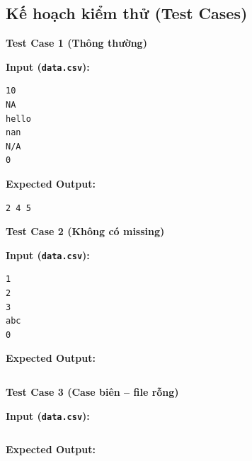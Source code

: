 \subsection{Kế hoạch kiểm thử (Test Cases)}

\textbf{Test Case 1 (Thông thường)}

\textbf{Input (\texttt{data.csv}):}
\begin{lstlisting}
10
NA
hello
nan
N/A
0

\end{lstlisting}

\textbf{Expected Output:}
\begin{lstlisting}
2 4 5
\end{lstlisting}

\vspace{0.5cm}

\textbf{Test Case 2 (Không có missing)}

\textbf{Input (\texttt{data.csv}):}
\begin{lstlisting}
1
2
3
abc
0
\end{lstlisting}

\textbf{Expected Output:}
\begin{lstlisting}

\end{lstlisting}

\vspace{0.5cm}

\textbf{Test Case 3 (Case biên -- file rỗng)}

\textbf{Input (\texttt{data.csv}):}
\begin{lstlisting}
\end{lstlisting}

\textbf{Expected Output:}
\begin{lstlisting}

\end{lstlisting}